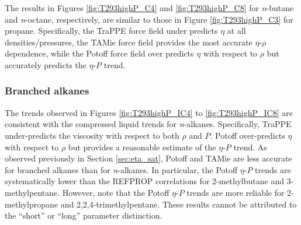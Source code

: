 \documentclass[preprint,review,12pt]{elsarticle}
\begin{document}
	The results in Figures \ref{fig:T293highP_C4} and \ref{fig:T293highP_C8} for \textit{n}-butane and \textit{n}-octane, respectively, are similar to those in Figure \ref{fig:T293highP_C3} for propane. Specifically, the TraPPE force field under predicts $\eta$ at all densities/pressures, the TAMie force field provides the most accurate $\eta$-$\rho$ dependence, while the Potoff force field over predicts $\eta$ with respect to $\rho$ but accurately predicts the $\eta$-$P$ trend.  
	
	\subsubsection{Branched alkanes}
	
	
	
   The trends observed in Figures \ref{fig:T293highP_IC4} to \ref{fig:T293highP_IC8} are consistent with the compressed liquid trends for \textit{n}-alkanes. Specifically, TraPPE under-predicts the viscosity with respect to both $\rho$ and $P$. Potoff over-predicts $\eta$ with respect to $\rho$ but provides a reasonable estimate of the $\eta$-$P$ trend. As observed previously in Section \ref{sec:eta_sat}, Potoff and TAMie are less accurate for branched alkanes than for \textit{n}-alkanes. In particular, the Potoff $\eta$-$P$ trends are systematically lower than the REFPROP correlations for 2-methylbutane and 3-methylpentane. However, note that the Potoff $\eta$-$P$ trends are more reliable for 2-methylpropane and 2,2,4-trimethylpentane. These results cannot be attributed to the ``short'' or ``long'' parameter distinction. 
	
\end{document}
